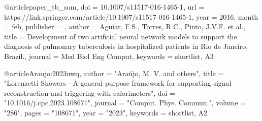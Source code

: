 


@article{paper_tb_som,
    doi = {10.1007/s11517-016-1465-1},
    url = {https://link.springer.com/article/10.1007/s11517-016-1465-1},
    year = {2016},
    month = {feb},
    publisher = {},
    author = {Aguiar, F.S., Torres, R.C., Pinto, J.V.F. et al.},
    title = {Development of two artificial neural network models to support the diagnosis of pulmonary tuberculosis in hospitalized patients in Rio de Janeiro, Brazil.},
    journal = {Med Biol Eng Comput},
    keywords = {shortlist, A3}
}


@article{Araujo:2023uwq,
    author = "Ara\'ujo, M. V. and others",
    title = "{Lorenzetti Showers - A general-purpose framework for supporting signal reconstruction and triggering with calorimeters}",
    doi = "10.1016/j.cpc.2023.108671",
    journal = "Comput. Phys. Commun.",
    volume = "286",
    pages = "108671",
    year = "2023",
    keywords = {shortlist, A2}
}
